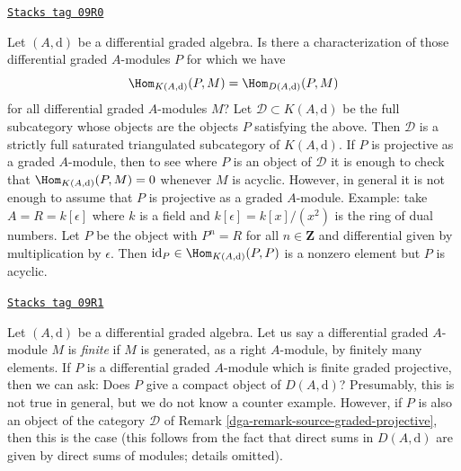 \begin{remark}
\label{dga-remark-source-graded-projective}
\href{https://stacks.math.columbia.edu/tag/09R0}{\texttt{Stacks tag 09R0}}

Let $(A, \text{d})$ be a differential graded algebra. Is there a
characterization of those differential graded $A$-modules $P$
for which we have
$$
\Hom_{K(A, \text{d})}(P, M) =  \Hom_{D(A, \text{d})}(P, M)
$$
for all differential graded $A$-modules $M$? Let
$\mathcal{D} \subset K(A, \text{d})$ be the full subcategory
whose objects are the objects $P$ satisfying the above. Then $\mathcal{D}$
is a strictly full saturated triangulated subcategory of $K(A, \text{d})$.
If $P$ is projective as a graded $A$-module, then to see where $P$
is an object of $\mathcal{D}$ it is enough to check that
$\Hom_{K(A, \text{d})}(P, M) = 0$ whenever $M$ is acyclic.
However, in general it is not enough to assume that $P$ is projective as
a graded $A$-module. Example: take $A = R = k[\epsilon]$ where $k$ is
a field and $k[\epsilon] = k[x]/(x^2)$ is the ring of dual numbers.
Let $P$ be the object with $P^n = R$ for all $n \in \mathbf{Z}$
and differential given by multiplication by $\epsilon$. Then
$\text{id}_P \in \Hom_{K(A, \text{d})}(P, P)$ is a nonzero element
but $P$ is acyclic.
\end{remark}

\begin{remark}
\label{dga-remark-graded-projective-is-compact}
\href{https://stacks.math.columbia.edu/tag/09R1}{\texttt{Stacks tag 09R1}}

Let $(A, \text{d})$ be a differential graded algebra. Let us say a
differential graded $A$-module $M$ is {\it finite} if $M$ is generated,
as a right $A$-module, by finitely many elements. If $P$ is a
differential graded $A$-module which is finite graded projective,
then we can ask: Does $P$ give a compact object of $D(A, \text{d})$?
Presumably, this is not true in general, but we do not know a
counter example. However, if $P$ is also an object of the category
$\mathcal{D}$ of Remark \ref{dga-remark-source-graded-projective},
then this is the case (this follows from the fact that direct sums
in $D(A, \text{d})$ are given by direct sums of modules; details omitted).
\end{remark}

